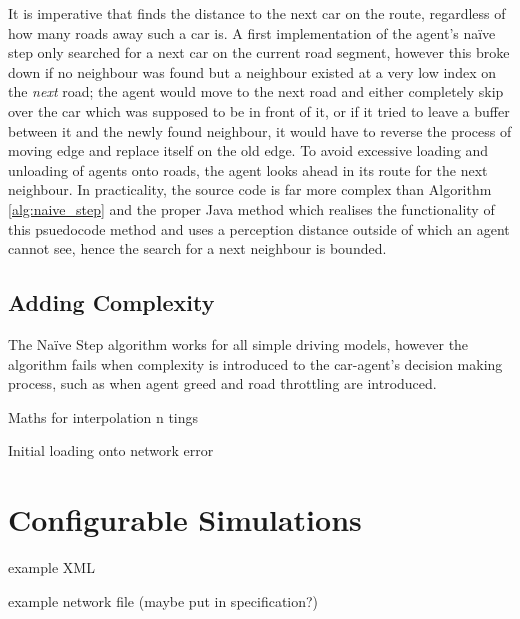 It is imperative that  finds the distance to the next car on the route, regardless of how many roads away such a car is. A first implementation of the agent's naïve step only searched for a next car on the current road segment, however this broke down if no neighbour was found but a neighbour existed at a very low index on the \textit{next} road; the agent would move to the next road and either completely skip over the car which was supposed to be in front of it, or if it tried to leave a buffer between it and the newly found neighbour, it would have to reverse the process of moving edge and replace itself on the old edge. To avoid excessive loading and unloading of agents onto roads, the agent looks ahead in its route for the next neighbour. In practicality, the source code is far more complex than Algorithm \ref{alg:naive_step} and the proper Java method  which realises the functionality of this psuedocode method and uses a perception distance outside of which an agent cannot see, hence the search for a next neighbour is bounded.


\subsection{Adding Complexity}

The Naïve Step algorithm works for all simple driving models, however the algorithm fails when complexity is introduced to the car-agent's decision making process, such as when agent greed and road throttling are introduced.

Maths for interpolation n tings
    
Initial loading onto network error

\section{Configurable Simulations}
\label{section:config}

example XML

example network file (maybe put in specification?)